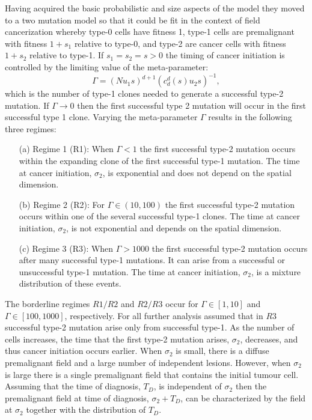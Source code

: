 \documentclass[\main/thesis.tex]{subfiles}
\begin{document}
Having acquired the basic probabilistic and size aspects of the model they moved to a two mutation model so that it could be fit in the context of field cancerization whereby type-0 cells have fitness 1, type-1 cells are premalignant with fitness $1 {+} s_1$ relative to type-0, and type-2 are cancer cells with fitness $1 {+} s_2$ relative to type-1. If $s_1{=}s_2{=}s > 0$ the timing of cancer initiation is controlled by the limiting value of the meta-parameter: 
$$\Gamma {=} (Nu_1s)^{d{+}1}(c_d^d(s)u_2s)^{-1},$$ 
which is the number of type-1 clones needed to generate a successful type-2 mutation. If $\Gamma \rightarrow 0$ then the first successful type 2 mutation will occur in the first successful type 1 clone. Varying the meta-parameter $\Gamma$ results in the following three regimes:
\begin{itemize}
  \item[(a)] Regime 1 (R1): When $\Gamma {<} 1$ the first successful type-2 
             mutation occurs within the expanding clone of the first successful 
             type-1 mutation. The time at cancer initiation, $\sigma_2$, is 
             exponential and does not depend on the spatial dimension.
  \item[(b)] Regime 2 (R2): For $\Gamma {\in} (10, 100)$ the first successful 
             type-2 mutation occurs within one of the several successful type-1 
             clones. The time at cancer initiation, $\sigma_2$, is not 
             exponential and depends on the spatial dimension.
  \item[(c)] Regime 3 (R3): When $\Gamma {>} 1000$ the first successful type-2 
             mutation occurs after many successful type-1 mutations. It can 
             arise from a successful or unsuccessful type-1 mutation. The time 
             at cancer initiation, $\sigma_2$, is a mixture distribution of 
             these events.
\end{itemize}
The borderline regimes $R1/R2$ and $R2/R3$ occur for $\Gamma {\in} [1, 10]$ and \newline$\Gamma {\in} [100, 1000]$, respectively. For all further analysis \textcite{Foo} assumed that in $R3$ successful type-2 mutation arise only from successful type-1. As the number of cells increases, the time that the first type-2 mutation arises, $\sigma_2$, decreases, and thus cancer initiation occurs earlier. When $\sigma_2$ is small, there is a diffuse premalignant field and a large number of independent lesions. However, when $\sigma_2$ is large there is a single premalignant field that contains the initial tumour cell. Assuming that the time of diagnosis, $T_D$, is independent of $\sigma_2$ then the premalignant field at time of diagnosis, $\sigma_2 {+} T_D$, can be characterized by the field at $\sigma_2$ together with the distribution of $T_D$. 
\end{document}
